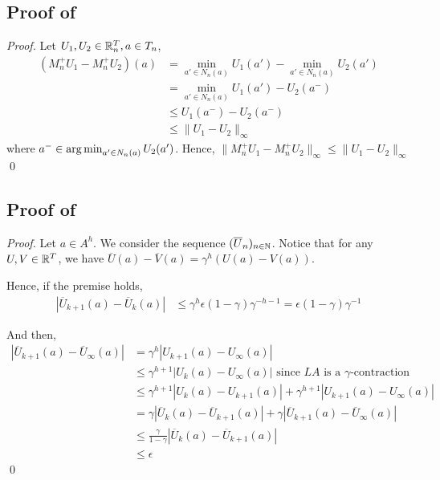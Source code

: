 \documentclass[runningheads]{llncs}
\begin{document}
\subsection{Proof of }
\begin{proof}
Let $U_1, U_2\in \mathbb{R}^T_n, a\in T_n$,
\begin{align*}
    (M_n^+ U_1 - M_n^+ U_2)(a) &= \min_{a'\in N_n(a)} U_1(a') - \min_{a'\in N_n(a)} U_2(a') \\
    &= \min_{a'\in N_n(a)} U_1(a') - U_2(a^-) \\
    &\leq U_1(a^-) - U_2(a^-) \\
    &\leq \|U_1 - U_2\|_\infty
\end{align*}
where $a^-\in \operatorname*{arg\,min}_{a'\in N_n(a)} U_2(a')$. 
Hence, $\|M_n^+ U_1 - M_n^+ U_2\|_\infty \leq \|U_1 - U_2\|_\infty$
\qed\end{proof}

\subsection{Proof of }

\begin{proof}
Let $a\in A^h$. We consider the sequence $(\overline{U}_n)_{n\in\mathbb{N}}$.
Notice that for any $U,V\in\mathbb{R}^T$, we have $\overline{U}(a)-\overline{V}(a)=\gamma^h(U(a)-V(a))$.

Hence, if the premise holds,
\begin{align*}
    |\overline{U}_{k+1}(a) - \overline{U}_{k}(a)| &\leq \gamma^h\epsilon (1-\gamma)\gamma^{-h-1} = \epsilon (1-\gamma)\gamma^{-1}
\end{align*}

And then,
\begin{align*}
|\overline{U}_{k+1}(a) - \overline{U}_\infty(a)| &= \gamma^h |U_{k+1}(a) - U_\infty(a)|\\
&\leq \gamma^{h+1}|U_{k}(a) - U_\infty(a)| \text{ since $LA$ is a $\gamma$-contraction}\\
&\leq \gamma^{h+1}|U_{k}(a) - U_{k+1}(a)| + \gamma^{h+1}|U_{k+1}(a) - U_\infty(a)|\\
&= \gamma|\overline{U}_{k}(a) - \overline{U}_{k+1}(a)| + \gamma |\overline{U}_{k+1}(a) - \overline{U}_\infty(a)|\\
&\leq \frac{\gamma}{1-\gamma} |\overline{U}_{k}(a) - \overline{U}_{k+1}(a)|\\
&\leq\epsilon
\end{align*}
\qed\end{proof}
\end{document}
